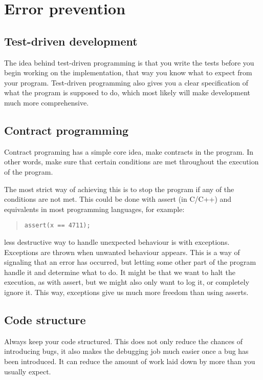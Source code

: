 \documentclass[11pt,a4paper,twoside]{article}
\begin{document}
\section{Error prevention}

\subsection{Test-driven development}

The idea behind test-driven programming is that you write the tests before you
begin working on the implementation, that way you know what to expect from your
program. Test-driven programming also gives you a clear specification of
what the program is supposed to do, which most likely will make development
much more comprehensive.


\subsection{Contract programming}

Contract programing has a simple core idea, make contracts in the program. In
other words, make sure that certain conditions are met throughout the execution
of the program.

The most strict way of achieving this is to stop the program if any of the
conditions are not met. This could be done with assert (in C/C++) and
equivalents in most programming languages, for example:

\begin{quote}
\begin{verbatim}
assert(x == 4711);
\end{verbatim}
\end{quote}

less destructive way to handle unexpected behaviour is with exceptions.
Exceptions are thrown when unwanted behaviour appears. This is a way of
signaling that an error has occurred, but letting some other part of the
program handle it and determine what to do. It might be that we want to halt
the execution, as with assert, but we might also only want to log it, or
completely ignore it. This way, exceptions give us much more freedom than using
asserts.

\subsection{Code structure}
Always keep your code structured. This does not only reduce the chances of
introducing bugs, it also makes the debugging job much easier once a bug has
been introduced. It can reduce the amount of work laid down by more than you
usually expect.
\end{document}
